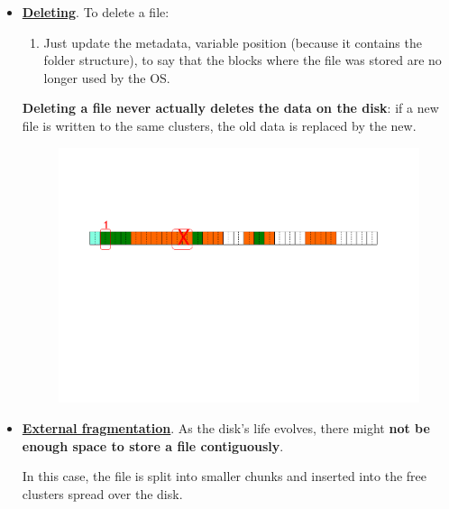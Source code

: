 \begin{itemize}
    \item \underline{\textbf{Deleting}}. To delete a file:
    \begin{enumerate}
        \item Just update the metadata, variable position (because it contains the folder structure), to say that the blocks where the file was stored are no longer used by the OS.
    \end{enumerate}
    \textbf{Deleting a file never actually deletes the data on the disk}: if a new file is written to the same clusters, the old data is replaced by the new.
    \begin{figure}[!htp]
        \centering
        \includegraphics[width=\textwidth]{img/files-4.pdf}
    \end{figure}
    
    \item \underline{\textbf{External fragmentation}}. As the disk's life evolves, there might \textbf{not be enough space to store a file contiguously}.
    
    In this case, the file is split into smaller chunks and inserted into the free clusters spread over the disk.
    

\end{itemize}

